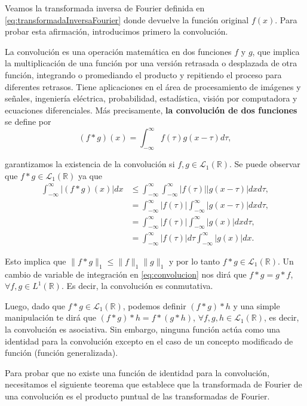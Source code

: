 \begin{multicols}{2}
Veamos la transformada inversa de Fourier definida en \ref{eq:transformadaInversaFourier} donde devuelve la función original $f(x)$. Para probar esta afirmación, introducimos primero la convolución.

La convolución es una operación matemática en dos funciones $f$ y $g$, que implica la multiplicación de una función por una versión retrasada o desplazada de otra función, integrando o promediando el producto y repitiendo el proceso para diferentes retrasos. Tiene aplicaciones en el área de procesamiento de imágenes y señales, ingeniería eléctrica, probabilidad, estadística, visión por computadora y ecuaciones diferenciales. Más precisamente, \textbf{la convolución de dos funciones} se define por
\begin{equation}
(f * g)(x) = \int_{-\infty}^{\infty} f(\tau) g(x - \tau) d\tau,
\label{eq:convolucion}
\end{equation}

garantizamos la existencia de la convolución si $f, g \in \mathcal{L}_1(\mathbb{R})$. Se puede observar que $f * g \in \mathcal{L}_1(\mathbb{R})$ ya que
\begin{align*}
\int_{-\infty}^{\infty} |(f * g)(x)| dx &\leq \int_{-\infty}^{\infty} \int_{-\infty}^{\infty} |f(\tau)||g(x - \tau)| dx d\tau, \\
&= \int_{-\infty}^{\infty} |f(\tau)| \int_{-\infty}^{\infty} |g(x - \tau)| dx d\tau, \\
&= \int_{-\infty}^{\infty} |f(\tau)| \int_{-\infty}^{\infty} |g(x)| dx d\tau, \\
&= \int_{-\infty}^{\infty} |f(\tau)| d\tau \int_{-\infty}^{\infty} |g(x)| dx.
\end{align*}

Esto implica que $\|f * g\|_1 \leq \|f\|_1 \|g\|_1$ y por lo tanto $f * g \in \mathcal{L}_1(\mathbb{R})$. Un cambio de variable de integración en \ref{eq:convolucion} nos dirá que $f * g = g * f$, $\forall f, g \in L^1(\mathbb{R})$. Es decir, la convolución es conmutativa. 

Luego, dado que $f * g \in \mathcal{L}_1(\mathbb{R})$, podemos definir $(f * g) * h$ y una simple manipulación te dirá que $(f * g) * h = f * (g * h)$, $\forall f, g, h \in \mathcal{L}_1(\mathbb{R})$, es decir, la convolución es asociativa. Sin embargo, ninguna función actúa como una identidad para la convolución excepto en el caso de un concepto modificado de función (función generalizada). 

Para probar que no existe una función de identidad para la convolución, necesitamos el siguiente teorema que establece que la transformada de Fourier de una convolución es el producto puntual de las transformadas de Fourier.\\


\end{multicols}
